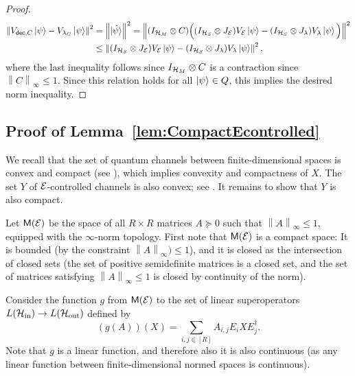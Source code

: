 \documentclass[10pt]{article}
\newcommand{\SIN}{\mathrm{in}}
\newcommand{\SOUT}{\mathrm{out}}
\newcommand{\norm}[1]{\left\|#1\right\|}
\newcommand{\s}[1]{\mathsf{#1}}
\begin{document}
\begin{proof}
\begin{align*}
            \norm{V_{\s{dec},C}\ket{\psi}-V_{\lambda_C}\ket{\psi}}^2&=\norm{\ket{\hat{\psi}}}^2=\norm{(I_{\calH_{M}}\otimes C)\Big((I_{\calH_S}\otimes J_{\calE})V_\calE\ket{\psi}- (I_{\calH_{S}}\otimes J_{\lambda})V_{\lambda}\ket{\psi}\Big)}^2\\
            &\leq \norm{(I_{\calH_S}\otimes J_{\calE})V_\calE\ket{\psi}- (I_{\calH_{S}}\otimes J_{\lambda})V_{\lambda}\ket{\psi}}^2,
        \end{align*}
        where the last inequality follows since $I_{{\cal H}_M}\otimes C$ is a contraction since $\norm{C}_{\infty}\leq 1$. 
Since this relation holds for all $\ket{\psi}\in Q$, this implies the desired norm inequality. 
    \end{proof}
    \subsection{Proof of Lemma~\ref{lem:CompactEcontrolled}}\label{app:LemmaCompactProof}
    We recall that the set of quantum channels between finite-dimensional spaces is convex and compact (see \cite[Proposition 2.28]{watrous2018theory}), which implies convexity and compactness of $X$. The set $Y$ of ${\cal E}$-controlled channels is also convex; see \cite[Observation~2]{Elimelech2026Theory}. It remains to show that  $Y$ is also compact. 
    
    Let $\s{M}(\calE)$ be the space of all $R\times R$ matrices $A\succeq 0$ such that $\norm{A}_{\infty}\leq 1$, equipped with the $\infty$-norm topology. First note that $\s{M}(\calE)$ is a compact space: It is bounded (by the constraint $\norm{A}_{\infty})\leq 1$), and it is closed as the intersection of closed sets (the set of positive semidefinite matrices is a closed set, and the set of matrices satisfying $\norm{A}_{\infty}\leq 1$ is closed by continuity of the norm). 
    
    Consider the function $g$ from $\s{M}(\calE)$ to the set of linear superoperators $L(\calH_{\SIN})\to L(\calH_{\SOUT})$ defined by 
    \[ (g(A))(X)=\sum_{i,j\in[R]} A_{i,j}E_i X E_j^\dag.\]
    Note that $g$ is a linear function, and therefore also it is also continuous (as any linear function between finite-dimensional normed spaces is continuous). 
    
\end{document}
